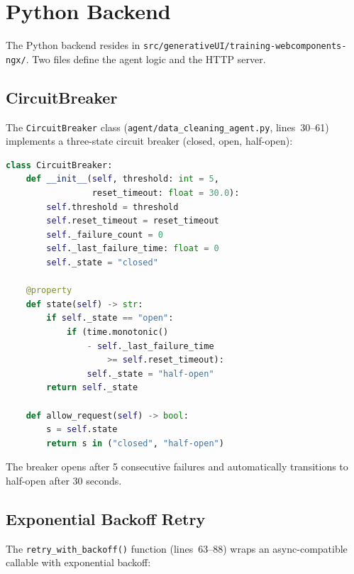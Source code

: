 \documentclass[11pt]{article}
\begin{document}
\section{Python Backend}
\label{sec:python}

The Python backend resides in \texttt{src/generativeUI/training-webcomponents-ngx/}.
Two files define the agent logic and the HTTP server.

\subsection{CircuitBreaker}

The \texttt{CircuitBreaker} class
(\texttt{agent/data\_cleaning\_agent.py}, lines~30--61) implements a three-state
circuit breaker (closed, open, half-open):

\begin{lstlisting}[language=Python,caption={CircuitBreaker (data\_cleaning\_agent.py:30--61)}]
class CircuitBreaker:
    def __init__(self, threshold: int = 5,
                 reset_timeout: float = 30.0):
        self.threshold = threshold
        self.reset_timeout = reset_timeout
        self._failure_count = 0
        self._last_failure_time: float = 0
        self._state = "closed"

    @property
    def state(self) -> str:
        if self._state == "open":
            if (time.monotonic()
                - self._last_failure_time
                    >= self.reset_timeout):
                self._state = "half-open"
        return self._state

    def allow_request(self) -> bool:
        s = self.state
        return s in ("closed", "half-open")
\end{lstlisting}

\noindent The breaker opens after 5 consecutive failures and automatically
transitions to half-open after 30 seconds.

\subsection{Exponential Backoff Retry}

The \texttt{retry\_with\_backoff()} function (lines~63--88) wraps an
async-compatible callable with exponential backoff:
\end{document}
